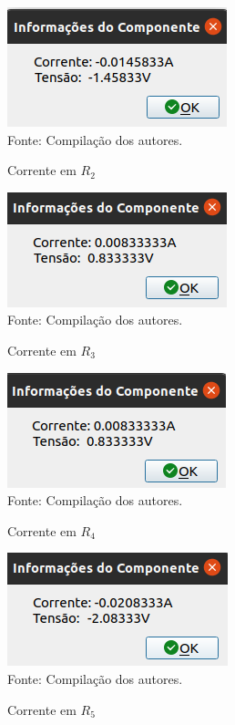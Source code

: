\documentclass[twocolumn, 10pt]{extarticle}
\begin{document}
\begin{figure}[H]
	\caption{Corrente em $R_2$} 
	\centering
	\includegraphics[scale=0.7]{ir2}
	\\ Fonte: Compilação dos autores.
\end{figure}

\begin{figure}[H]
	\caption{Corrente em $R_3$} 
	\centering
	\includegraphics[scale=0.7]{ir3}
	\\ Fonte: Compilação dos autores.
\end{figure}

\begin{figure}[H]
	\caption{Corrente em $R_4$} 
	\centering
	\includegraphics[scale=0.7]{ir4}
	\\ Fonte: Compilação dos autores.
\end{figure}

\begin{figure}[H]
	\caption{Corrente em $R_5$} 
	\centering
	\includegraphics[scale=0.7]{ir5}
	\\ Fonte: Compilação dos autores.
\end{figure}
\end{document}
